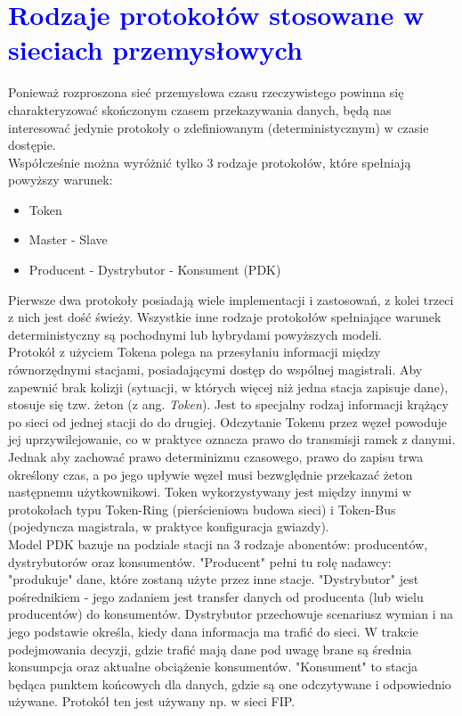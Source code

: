 \documentclass[a4paper,twoside]{article}
\begin{document}
\section{\textcolor{blue}{Rodzaje protokołów stosowane w sieciach przemysłowych}}

Ponieważ rozproszona sieć przemysłowa czasu rzeczywistego powinna się charakteryzować skończonym czasem przekazywania danych, będą nas interesować jedynie protokoły o zdefiniowanym (deterministycznym) w czasie dostępie. \\
Współcześnie można wyróżnić tylko 3 rodzaje protokołów, które spełniają powyższy warunek:
\begin{itemize}
	\item Token
	\item Master - Slave
	\item Producent - Dystrybutor - Konsument (PDK)
\end{itemize}
Pierwsze dwa protokoły posiadają wiele implementacji i zastosowań, z kolei trzeci z nich jest dość świeży. Wszystkie inne rodzaje protokołów spełniające warunek deterministyczny są pochodnymi lub hybrydami powyższych modeli. \\
Protokół z użyciem Tokena polega na przesyłaniu informacji między równorzędnymi stacjami, posiadającymi dostęp do wspólnej magistrali. Aby zapewnić brak kolizji (sytuacji, w których więcej niż jedna stacja zapisuje dane), stosuje się tzw. żeton (z ang. \textit{Token}). Jest to specjalny rodzaj informacji krążący po sieci od jednej stacji do do drugiej. Odczytanie Tokenu przez węzeł powoduje jej uprzywilejowanie, co w praktyce oznacza prawo do transmisji ramek z danymi. Jednak aby zachować prawo determinizmu czasowego, prawo do zapisu trwa określony czas, a po jego upływie węzeł musi bezwględnie przekazać żeton następnemu użytkownikowi. Token wykorzystywany jest między innymi w protokołach typu Token-Ring (pierścieniowa budowa sieci) i Token-Bus (pojedyncza magistrala, w praktyce konfiguracja gwiazdy). \\
Model PDK bazuje na podziale stacji na 3 rodzaje abonentów: producentów, dystrybutorów oraz konsumentów. "Producent" pełni tu rolę nadawcy: "produkuje" dane, które zostaną użyte przez inne stacje. "Dystrybutor" jest pośrednikiem - jego zadaniem jest transfer danych od producenta (lub wielu producentów) do konsumentów. Dystrybutor przechowuje scenariusz wymian i na jego podstawie określa, kiedy dana informacja ma trafić do sieci. W trakcie podejmowania decyzji, gdzie trafić mają dane pod uwagę brane są średnia konsumpcja oraz aktualne obciążenie konsumentów. "Konsument" to stacja będąca punktem końcowych dla danych, gdzie są one odczytywane i odpowiednio używane. Protokół ten jest używany np. w sieci FIP.
\end{document}
